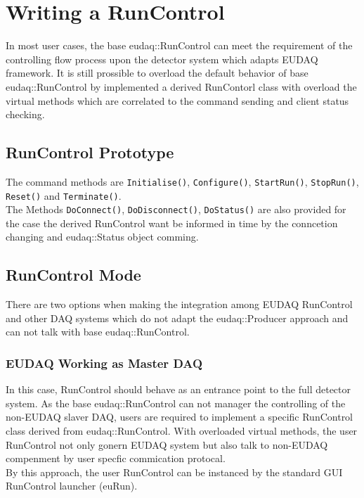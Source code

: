 \section{Writing a RunControl}\label{sec:RunControlWriting}
In most user cases, the base eudaq::RunControl can meet the requirement of the controlling flow process upon the detector system which adapts EUDAQ framework. It is still prossible to overload the default behavior of base eudaq::RunControl by implemented a derived RunContorl class with overload the virtual methods which are correlated to the command sending and client status checking.\\

\subsection{RunControl Prototype}
The command methods are \lstinline[style=cpp]{Initialise()}, \lstinline[style=cpp]{Configure()}, \lstinline[style=cpp]{StartRun()}, \lstinline[style=cpp]{StopRun()}, \lstinline[style=cpp]{Reset()} and \lstinline[style=cpp]{Terminate()}. \\

The Methods \lstinline[style=cpp]{DoConnect()}, \lstinline[style=cpp]{DoDisconnect()}, \lstinline[style=cpp]{DoStatus()} are also provided for the case the derived RunControl want be informed in time by the conncetion changing and eudaq::Status object comming.\\


\subsection{RunControl Mode}
There are two options when making the integration among EUDAQ RunControl and other DAQ systems which do not adapt the eudaq::Producer approach and can not talk with base eudaq::RunControl.
\subsubsection{EUDAQ Working as Master DAQ}
In this case, RunControl should behave as an entrance point to the full detector system. As the base eudaq::RunControl can not manager the controlling of the non-EUDAQ slaver DAQ, users are required to implement a specific RunControl class derived from eudaq::RunControl. With overloaded virtual methods, the user RunControl not only gonern EUDAQ system but also talk to non-EUDAQ compenment by user specfic commication protocal.\\
By this approach, the user RunControl can be instanced by the standard GUI RunControl launcher (euRun).

